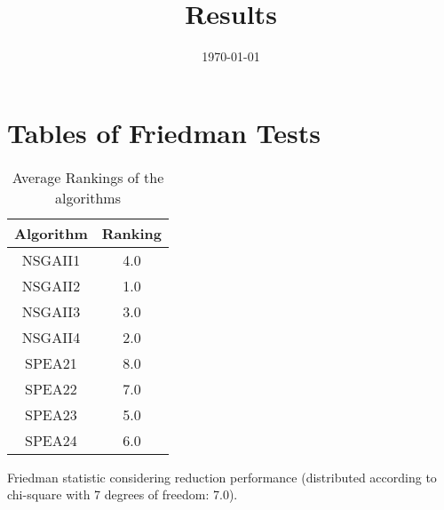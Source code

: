 \documentclass{article}
\title{Results}
\author{}
\date{\today}
\begin{document}
\oddsidemargin 0in \topmargin 0in\maketitle
\section{Tables of Friedman Tests}
\begin{table}[!htp]
\centering
\caption{Average Rankings of the algorithms
}\begin{tabular}{c|c}
Algorithm&Ranking\\
\hline
NSGAII1&4.0\\
NSGAII2&1.0\\
NSGAII3&3.0\\
NSGAII4&2.0\\
SPEA21&8.0\\
SPEA22&7.0\\
SPEA23&5.0\\
SPEA24&6.0\\
\end{tabular}
\end{table}


Friedman statistic considering reduction performance (distributed according to chi-square with 7 degrees of freedom: 7.0).
\end{document}
